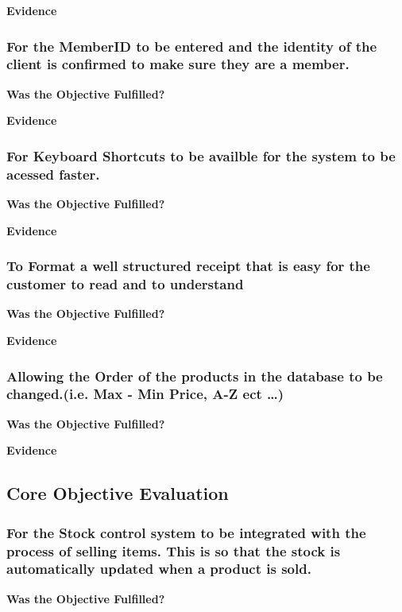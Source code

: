 \textbf{Evidence} \newline





\subsubsection{For the MemberID to be entered and the identity of the client is confirmed to make sure they are a member.}
\textbf{Was the Objective Fulfilled?} \newline

\textbf{Evidence} \newline




\subsubsection{For Keyboard Shortcuts to be availble for the system to be acessed faster.}
\textbf{Was the Objective Fulfilled?} \newline

\textbf{Evidence} \newline




\subsubsection{To Format a well structured receipt that is easy for the customer to read and to understand}
\textbf{Was the Objective Fulfilled?} \newline

\textbf{Evidence} \newline




\subsubsection{Allowing the Order of the products in the database to be changed.(i.e. Max - Min Price, A-Z ect \ldots)}
\textbf{Was the Objective Fulfilled?} \newline

\textbf{Evidence} \newline


\subsection{Core Objective Evaluation}

\subsubsection{For the Stock control system to be integrated with the process of selling items. This is so that the stock is automatically updated when a product is sold.}
\textbf{Was the Objective Fulfilled?} \newline

